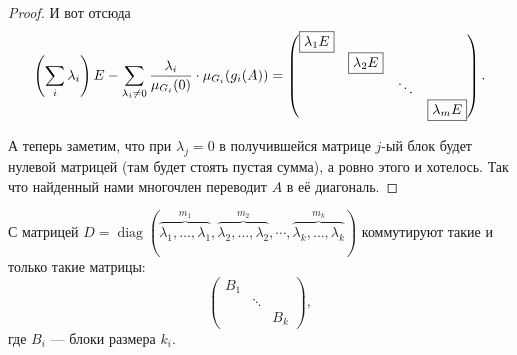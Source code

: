 \begin{proof}
    И вот отсюда
    \[
        \left(\sum_i\lambda_i\right)E - \sum_{\lambda_i \ne 0}\frac{\lambda_i}{\mu_{G_i}(0)} \cdot \mu_{G_i}(g_i(A)) =
        \begin{pmatrix}
            \fbox{$\lambda_1E$} & & & \\
             & \fbox{$\lambda_2E$} & &\\
             & & \ddots &\\
             & & & \fbox{$\lambda_mE$}
        \end{pmatrix}.
    \]

    А теперь заметим, что при $\lambda_j = 0$ в получившейся матрице $j$-ый блок будет нулевой матрицей (там будет стоять пустая сумма), а ровно этого и хотелось. Так что найденный нами многочлен переводит $A$ в её диагональ.
\end{proof}

\begin{lemma}
    С матрицей $D = \operatorname{diag}(\overbrace{\lambda_1, \ldots, \lambda_1}^{m_1}, \overbrace{\lambda_2, \ldots, \lambda_2}^{m_2}, \cdots, \overbrace{\lambda_k, \ldots, \lambda_k}^{m_k})$ коммутируют такие и только такие матрицы:
    \[
        \begin{pmatrix}
            B_1 & & \\
             & \ddots & \\
             & & B_k
        \end{pmatrix},
    \]
    где $B_i$ --- блоки размера $k_i$.
\end{lemma}

